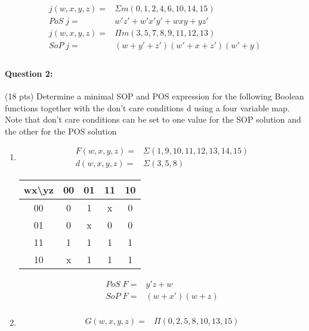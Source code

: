 \documentclass[12pt,letterpaper,titlepage]{report}
\begin{document}
\begin{raggedright}
\begin{multicols*}{2}
\begin{enumerate}[noitemsep, label=\alph*)]
\begin{center}
\begin{tabular}{|c||c|c|c|c|}
\end{tabular}
\end{center}
\begin{align*}
j(w,x,y,z) =& \Sigma m(0, 1, 2, 4, 6, 10, 14, 15)\\
   PoS\; j =& w'z'+w'x'y'+wxy+yz'\\
j(w,x,y,z) =& \Pi m(3, 5, 7, 8, 9, 11, 12, 13)\\
   SoP\; j =& (w+y'+z')(w'+x+z')(w'+y)\\
\end{align*}
\end{enumerate}
\end{multicols*}
\pagebreak

\paragraph{Question 2:} 
(18 pts) Determine a minimal SOP and POS expression for the following Boolean functions together with the don’t care conditions d using a four variable map. Note that don’t care conditions can be set to one value for the SOP solution and the other for the POS solution
\begin{multicols*}{2}\raggedcolumns
\begin{enumerate}[noitemsep, label=\alph*)]
\item \begin{align*}
		F(w,x,y,z) =& \Sigma(1,9,10,11,12,13,14,15)\\
		d(w,x,y,z) =& \Sigma(3,5,8)
	  \end{align*}
\begin{center}
\begin{tabular}{|c||c|c|c|c|}\hline
wx\textbackslash yz
   & 00 & 01 & 11 & 10 \\\hline\hline
00 &  0 &  1 &  x &  0 \\\hline
01 &  0 &  x &  0 &  0 \\\hline 
11 &  1 &  1 &  1 &  1 \\\hline
10 &  x &  1 &  1 &  1 \\\hline
\end{tabular}
\end{center}
\begin{align*}
 PoS\; F =& y'z+w\\
 SoP\; F =& (w+x')(w+z)\\
\end{align*}
\item \begin{align*}
		G(w,x,y,z) =& \Pi(0,2,5,8,10,13,15)\\

\end{align*}
\end{enumerate}
\end{multicols*}
\end{raggedright}
\end{document}
